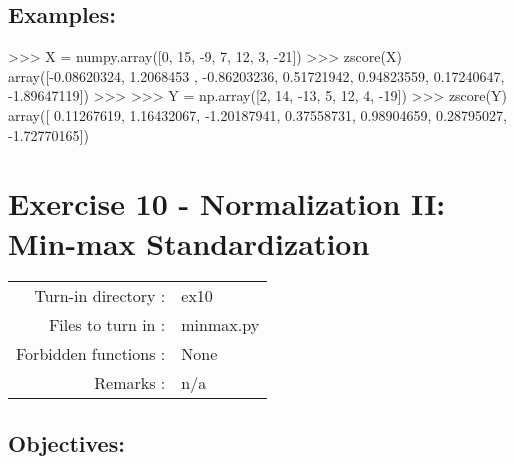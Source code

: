 \documentclass[]{article}
\newenvironment{Shaded}{\begin{snugshade}}{\end{snugshade}}
\newcommand{\DecValTok}[1]{\textcolor[rgb]{0.96,0.45,0.00}{#1}}
\newcommand{\FloatTok}[1]{\textcolor[rgb]{0.96,0.45,0.00}{#1}}
\newcommand{\NormalTok}[1]{\textcolor[rgb]{0.81,0.81,0.76}{#1}}
\newcommand{\OperatorTok}[1]{\textcolor[rgb]{0.81,0.81,0.76}{#1}}
\begin{document}
\hypertarget{examples-7}{%
\subsection{Examples:}\label{examples-7}}

\begin{Shaded}
\begin{Highlighting}[]
\OperatorTok{>>>}\NormalTok{ X }\OperatorTok{=}\NormalTok{ numpy.array([}\DecValTok{0}\NormalTok{, }\DecValTok{15}\NormalTok{, }\DecValTok{-9}\NormalTok{, }\DecValTok{7}\NormalTok{, }\DecValTok{12}\NormalTok{, }\DecValTok{3}\NormalTok{, }\DecValTok{-21}\NormalTok{])}
\OperatorTok{>>>}\NormalTok{ zscore(X)}
\NormalTok{array([}\OperatorTok{-}\FloatTok{0.08620324}\NormalTok{,  }\FloatTok{1.2068453}\NormalTok{ , }\FloatTok{-0.86203236}\NormalTok{,  }\FloatTok{0.51721942}\NormalTok{,  }\FloatTok{0.94823559}\NormalTok{,}
        \FloatTok{0.17240647}\NormalTok{, }\FloatTok{-1.89647119}\NormalTok{])}
\OperatorTok{>>>}
\OperatorTok{>>>}\NormalTok{ Y }\OperatorTok{=}\NormalTok{ np.array([}\DecValTok{2}\NormalTok{, }\DecValTok{14}\NormalTok{, }\DecValTok{-13}\NormalTok{, }\DecValTok{5}\NormalTok{, }\DecValTok{12}\NormalTok{, }\DecValTok{4}\NormalTok{, }\DecValTok{-19}\NormalTok{])}
\OperatorTok{>>>}\NormalTok{ zscore(Y)}
\NormalTok{array([ }\FloatTok{0.11267619}\NormalTok{,  }\FloatTok{1.16432067}\NormalTok{, }\FloatTok{-1.20187941}\NormalTok{,  }\FloatTok{0.37558731}\NormalTok{,  }\FloatTok{0.98904659}\NormalTok{,}
        \FloatTok{0.28795027}\NormalTok{, }\FloatTok{-1.72770165}\NormalTok{])}
\end{Highlighting}
\end{Shaded}

\clearpage

\hypertarget{exercise-10---normalization-ii-min-max-standardization-1}{%
\section{Exercise 10 - Normalization II: Min-max
Standardization}\label{exercise-10---normalization-ii-min-max-standardization-1}}

\begin{longtable}[]{@{}rl@{}}
\toprule
\endhead
Turn-in directory : & ex10\tabularnewline
Files to turn in : & minmax.py\tabularnewline
Forbidden functions : & None\tabularnewline
Remarks : & n/a\tabularnewline
\bottomrule
\end{longtable}

\hypertarget{objectives-8}{%
\subsection{Objectives:}\label{objectives-8}}
\end{document}
